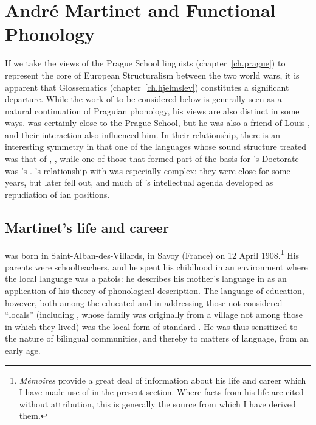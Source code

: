 \chapter{André Martinet and Functional Phonology}
\label{ch.martinet}

If we take the views of the {Prague School} linguists
(chapter~\ref{ch.prague}) to represent the core of European
Structuralism between the two world wars, it is apparent that
Glossematics (chapter~\ref{ch.hjelmslev}) constitutes a significant
departure.  While the work of  to be considered below is
generally seen as a natural continuation of Praguian phonology, his
views are also distinct in some ways. {\Martinet} was certainly close to
the {Prague School}, but he was also a friend of Louis {\Hjelmslev}, and
their interaction also influenced him.  In their relationship, there
is an interesting symmetry in that one of the languages whose sound
structure {\Hjelmslev} treated was that of {\Martinet}, , while one of
those that formed part of the basis for {\Martinet}'s Doctorate was
{\Hjelmslev}'s . {\Martinet}'s relationship with {\Jakobson} was
especially complex: they were close for some years, but later fell
out, and much of {\Martinet}'s intellectual agenda developed as
repudiation of {\Jakobson}ian positions.


\section{Martinet's life and career}
\label{sec:martinet-life}

 was born in Saint-Alban-des-Villards, in Savoy (France)
on 12 April 1908.\footnote{
  \textsl{Mémoires} provide a great deal of information about his life
  and career which I have made use of in the present section. Where
  facts from his life are cited without attribution, this is generally
  the source from which I have derived them.} His parents were
schoolteachers, and he spent his childhood in an environment where the
local language was a  patois: he describes his
mother's language in \citealt{martinet56:description} as an application
of his theory of phonological description.  The language of education,
however, both among the educated and in addressing those not
considered ``locals'' (including {\Martinet}, whose family was originally
from a village not among those in which they lived) was the local form
of standard . He was thus sensitized to the nature of bilingual
communities, and thereby to matters of language, from an early age.

